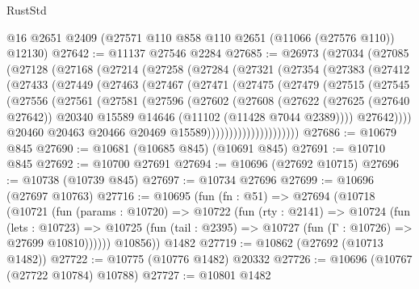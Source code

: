 \begin{lexlean}{RustStd}
\begin{coremodule}
    @16
    @2651
    @2409
    (@27571 @110 @858 @110 @2651 (@11066 (@27576 @110)) @12130)
@27642 := @11137 @27546 @2284
@27685 := @26973
    (@27034
      (@27085
        (@27128
          (@27168
            (@27214
              (@27258
                (@27284
                  (@27321
                    (@27354
                      (@27383
                        (@27412
                          (@27433
                            (@27449
                              (@27463
                                (@27467
                                  (@27471
                                    (@27475
                                      (@27479
                                        (@27515
                                          (@27545
                                            (@27556
                                              (@27561
                                                (@27581
                                                  (@27596
                                                    (@27602
                                                      (@27608
                                                        (@27622
                                                          (@27625 (@27640 @27642))
                                                          @20340
                                                          @15589
                                                          @14646
                                                          (@11102 (@11428 @7044 @2389))))
                                                      @27642))))
                                              @20460
                                              @20463
                                              @20466
                                              @20469
                                              @15589)))))))))))))))))))))
@27686 := @10679 @845
@27690 := @10681 (@10685 @845) (@10691 @845)
@27691 := @10710 @845
@27692 := @10700 @27691
@27694 := @10696 (@27692 @10715)
@27696 := @10738 (@10739 @845)
@27697 := @10734 @27696
@27699 := @10696 (@27697 @10763)
@27716 := @10695
    (fun (fn : @51) =>
    @27694
      (@10718
        (@10721
          (fun (params : @10720) =>
          @10722
            (fun (rty : @2141) =>
            @10724
              (fun (lets : @10723) =>
              @10725 (fun (tail : @2395) => @10727 (fun (Γ : @10726) => @27699 @10810))))))
        @10856))
    @1482
@27719 := @10862 (@27692 (@10713 @1482))
@27722 := @10775 (@10776 @1482) @20332
@27726 := @10696 (@10767 (@27722 @10784) @10788)
@27727 := @10801 @1482

\end{coremodule}
\end{lexlean}
